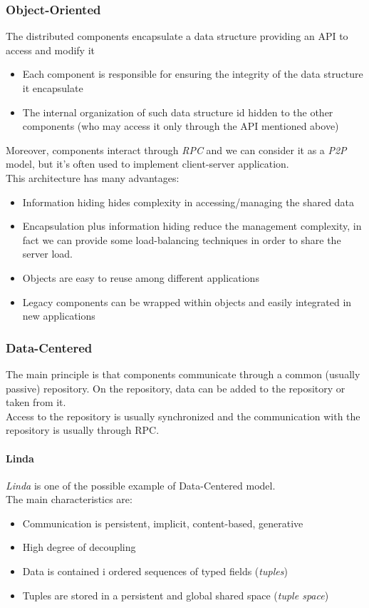     \subsubsection{Object-Oriented}
    The distributed components encapsulate a data structure providing an API to access
    and modify it
    \begin{itemize}
        \item Each component is responsible for ensuring the integrity of the data structure
            it encapsulate
        \item The internal organization of such data structure id hidden to the other components
            (who may access it only through the API mentioned above)
    \end{itemize}
    Moreover, components interact through \textit{RPC} and we can consider it as a \textit{P2P} model,
    but it's often used to implement client-server application.\\
    This architecture has many advantages:
    \begin{itemize}
        \item Information hiding hides complexity in accessing/managing the shared data
        \item Encapsulation plus information hiding reduce the management complexity, in fact we
            can provide some load-balancing techniques in order to share the server load.
        \item Objects are easy to reuse among different applications
        \item Legacy components can be wrapped within objects and easily integrated in new applications
    \end{itemize}

    \subsubsection{Data-Centered}
    The main principle is that components communicate through a common (usually passive) repository.
    On the repository, data can be added to the repository or taken from it.\\
    Access to the repository is usually synchronized and the communication with the 
    repository is usually through RPC.

    \paragraph{Linda}
    \textit{Linda} is one of the possible example of Data-Centered model.\\
    The main characteristics are:
    \begin{itemize}
        \item Communication is persistent, implicit, content-based, generative
        \item High degree of decoupling
        \item Data is contained i ordered sequences of typed fields (\textit{tuples})
        \item Tuples are stored in a persistent and global shared space (\textit{tuple space})
    \end{itemize}

